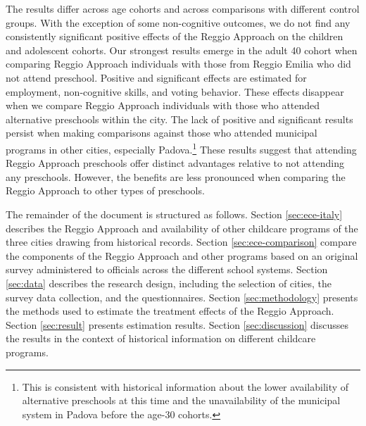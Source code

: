 The results differ across age cohorts and across comparisons with different control groups. With the exception of some non-cognitive outcomes, we do not find any consistently significant positive effects of the Reggio Approach on the children and adolescent cohorts. Our strongest results emerge in the adult 40 cohort when comparing Reggio Approach individuals with those from Reggio Emilia who did not attend preschool. Positive and significant effects are estimated for employment, non-cognitive skills, and voting behavior. These effects disappear when we compare Reggio Approach individuals with those who attended alternative preschools within the city. The lack of positive and significant results persist when making comparisons against those who attended municipal programs in other cities, especially Padova.\footnote{This is consistent with historical information about the lower availability of alternative preschools at this time and the unavailability of the municipal system in Padova before the age-30 cohorts.} These results suggest that attending Reggio Approach preschools offer distinct advantages relative to not attending any preschools. However, the benefits are less pronounced when comparing the Reggio Approach to other types of preschools. 

The remainder of the document is structured as follows. Section \ref{sec:ece-italy} describes the Reggio Approach and availability of other childcare programs of the three cities drawing from historical records. Section \ref{sec:ece-comparison} compare the components of the Reggio Approach and other programs based on an original survey administered to officials across the different school systems. Section \ref{sec:data} describes the research design, including the selection of cities, the survey data collection, and the questionnaires. Section \ref{sec:methodology} presents the methods used to estimate the treatment effects of the Reggio Approach. Section \ref{sec:result} presents estimation results. Section \ref{sec:discussion} discusses the results in the context of historical information on different childcare programs. 

